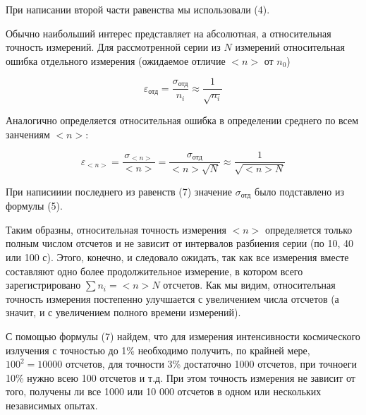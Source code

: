 \documentclass[14pt]{article}
\begin{document}
\noindent При написании второй части равенства мы использовали (4).

Обычно наибольший интерес представляет на абсолютная, а относительная точность измерений. Для рассмотренной серии из $N$ измерений относительная ошибка отдельного измерения (ожидаемое отличие $<n>$ от $n_0$)

\begin{equation}
\varepsilon_{\text{отд}} = \frac{\sigma_{\text{отд}}}{n_i} \approx \frac{1}{\sqrt{n_i}}
\end{equation}

Аналогично определяется относительная ошибка в определении среднего по всем занчениям $<n>$:

\begin{equation}
\varepsilon_{<n>} = \frac{\sigma_{<n>}}{<n>} = \frac{\sigma_{\text{отд}}}{<n>\sqrt{N}} \approx \frac{1}{\sqrt{<n>N}}
\end{equation}

При написииии последнего из равенств (7) значение $\sigma_{\text{отд}}$ было подставлено из формулы (5).

Таким образны, относительная точность измерения $<n>$ определяется только полным числом отсчетов и не зависит от интервалов разбиения серии (по 10, 40 или 100 с). Этого, конечно, и следовало ожидать, так как все измерения вместе составляют одно более продолжительное измерение, в котором всего зарегистрировано $\sum n_i = <n>N$ отсчетов. Как мы видим, относителъная точность измерения постепенно улучшается с увеличением числа отсчетов (а значит, и с увеличением полного времени измерений).

С помощью формулы (7) найдем, что для измерения интенсивности
космического излучения с точностью до 1\% необходимо получить, по крайней мере, $100^2 = 10000$ отсчетов, для точности 3\% достаточно 1000 отсчетов, при точноеги 10\% нужно всею 100 отсчетов и т.д. При этом точность измерения не зависит от того, получены ли все 1000 или 10 000 отсчетов в одном или нескольких независимых опытах.
\end{document}

